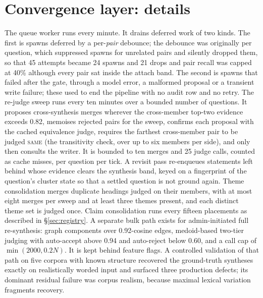 \documentclass{article}
\begin{document}
\section{Convergence layer: details}
\label{app:convergence}
The queue worker runs every minute. It drains deferred work of two kinds. The first is spawns deferred by a per-\emph{pair} debounce; the debounce was originally per question, which suppressed spawns for unrelated pairs and silently dropped them, so that 45 attempts became 24 spawns and 21 drops and pair recall was capped at 40\% although every pair sat inside the attach band. The second is spawns that failed after the gate, through a model error, a malformed proposal or a transient write failure; these used to end the pipeline with no audit row and no retry. The re-judge sweep runs every ten minutes over a bounded number of questions. It proposes cross-synthesis merges wherever the cross-member top-two evidence exceeds 0.82, memoises rejected pairs for the sweep, confirms each proposal with the cached equivalence judge, requires the farthest cross-member pair to be judged \textsc{same} (the transitivity check, over up to six members per side), and only then consults the writer. It is bounded to ten merges and 25 judge calls, counted as cache misses, per question per tick. A revisit pass re-enqueues statements left behind whose evidence clears the synthesis band, keyed on a fingerprint of the question's cluster state so that a settled question is not ground again. Theme consolidation merges duplicate headings judged on their members, with at most eight merges per sweep and at least three themes present, and each distinct theme set is judged once. Claim consolidation runs every fifteen placements as described in \S\ref{sec:registry}. A separate bulk path exists for admin-initiated full re-synthesis: graph components over 0.92-cosine edges, medoid-based two-tier judging with auto-accept above 0.94 and auto-reject below 0.60, and a call cap of $\min(2000, 0.2N)$. It is kept behind feature flags. A controlled validation of that path on five corpora with known structure recovered the ground-truth syntheses exactly on realistically worded input and surfaced three production defects; its dominant residual failure was corpus realism, because maximal lexical variation fragments recovery.
\end{document}
